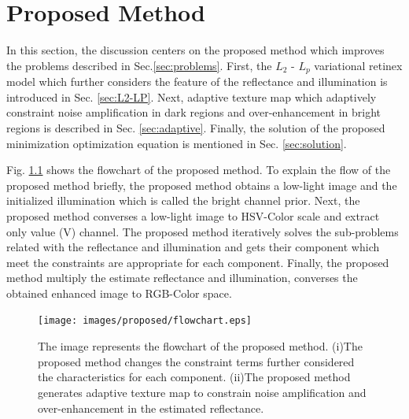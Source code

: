 \chapter{Proposed Method}
\label{sec:proposed}
In this section, the discussion centers on the proposed method which improves the problems described in Sec.\ref{sec:problems}.
First, the $L_{2}$ - $L_{p}$ variational retinex model which further considers the feature of the reflectance and illumination is introduced in Sec. \ref{sec:L2-LP}. 
Next, adaptive texture map which adaptively constraint noise amplification in dark regions and over-enhancement in bright regions is described in Sec. \ref{sec:adaptive}. 
Finally, the solution of the proposed minimization optimization equation is mentioned in Sec. \ref{sec:solution}.\par
Fig. \ref{fig:proposed/flowchart} shows the flowchart of the proposed method.
To explain the flow of the proposed method briefly, the proposed method obtains a low-light image and the initialized illumination which is called the bright channel prior. Next, the proposed method converses a low-light image to HSV-Color scale and extract only value (V) channel. The proposed method iteratively solves the sub-problems related with the reflectance and illumination and gets their component which meet the constraints are appropriate for each component. Finally, the proposed method multiply the estimate reflectance and illumination, converses the obtained enhanced image to RGB-Color space.

\begin{figure}[htbp]
	\centering
	\texttt{[image: images/proposed/flowchart.eps]}
	\caption{The image represents the flowchart of the proposed method. (i)The proposed method changes the constraint terms further considered the characteristics for each component. (ii)The proposed method generates adaptive texture map to constrain noise  amplification and over-enhancement in the estimated reflectance. } \label{fig:proposed/flowchart}
\end{figure}

